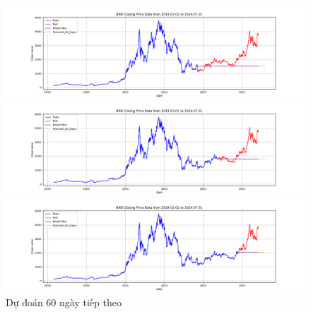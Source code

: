 \documentclass[conference]{IEEEtran}
\begin{document}
	\begin{figure}[H]
		\centering
		\begin{minipage}{0.15\textwidth}
			\centering
			\includegraphics[width=1\textwidth]{Figure/ARIMA_ETH_60days_73.png}
		\end{minipage}
		\hfill
		\begin{minipage}{0.15\textwidth}
			\centering
			\includegraphics[width=1\textwidth]{Figure/ARIMA_ETH_60days_82.png}
		\end{minipage}
		\hfill
		\begin{minipage}{0.15\textwidth}
			\centering
			\includegraphics[width=1\textwidth]{Figure/ARIMA_ETH_60days_91.png}
		\end{minipage}
		\caption{Dự đoán 60 ngày tiếp theo}
		\label{fig:1}
	\end{figure}
	
\end{document}
